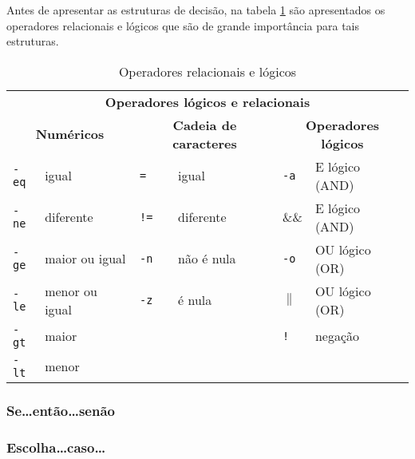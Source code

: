 \documentclass[11pt]{../classes/ifscarticle}
\begin{document}
Antes de apresentar as estruturas de decisão, na tabela \ref{tabelaoperadores} são apresentados os operadores relacionais e lógicos que são de grande importância para tais estruturas.

\begin{table}[!htpb]
 \begin{center}
\begin{tabular}{ll||ll||ll} \toprule
\multicolumn{6}{c}{\textbf{Operadores lógicos e relacionais}} \\ 
\multicolumn{2}{c}{\textbf{Numéricos}} & \multicolumn{2}{c}{\textbf{Cadeia de caracteres}} & \multicolumn{2}{c}{\textbf{Operadores lógicos}}\\ \midrule
\texttt{-eq} & igual     & \texttt{=} & igual & \texttt{-a} & E lógico (AND) \\ \hline
\texttt{-ne} & diferente & \texttt{!=} & diferente & \&\& & E lógico (AND)\\ \hline
\texttt{-ge} & maior ou igual & \texttt{-n} & não é nula & \texttt{-o} & OU lógico (OR)\\ \hline
\texttt{-le} & menor ou igual & \texttt{-z} & é nula & $\|$ & OU lógico (OR)\\ \hline
\texttt{-gt} & maior &  & & \texttt{!} & negação \\ \hline
\texttt{-lt} & menor &  &  & &\\ \bottomrule
 \end{tabular}
 \end{center}
\caption{Operadores relacionais e lógicos}
\label{tabelaoperadores}
\end{table}


\subsubsection{Se\ldots então\ldots senão}


\clearpage


\subsubsection{Escolha\ldots caso\ldots}


\newpage
\end{document}
